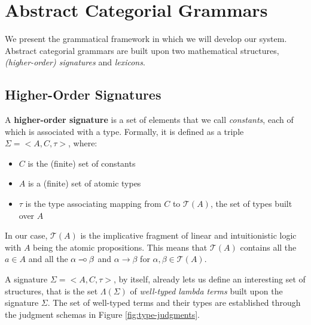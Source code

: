 \section{Abstract Categorial Grammars}
\label{sec:acg}

We present the grammatical framework in which we will develop our
system. Abstract categorial grammars are built upon two mathematical
structures, \emph{(higher-order) signatures} and \emph{lexicons}.

\subsection{Higher-Order Signatures}
\label{ssec:sig}

A \textbf{higher-order signature} is a set of elements that we call
\emph{constants}, each of which is associated with a type. Formally, it
is defined as a triple $\Sigma = \mathopen{<}A, C, \tau\mathclose{>}$,
where:
\begin{itemize}
  \item $C$ is the (finite) set of constants
  \item $A$ is a (finite) set of atomic types
  \item $\tau$ is the type associating mapping from $C$ to $\mathcal{T}(A)$,
    the set of types built over $A$
\end{itemize}

In our case, $\mathcal{T}(A)$ is the implicative fragment of linear and
intuitionistic logic with $A$ being the atomic propositions. This means
that $\mathcal{T}(A)$ contains all the $a \in A$ and all the $\alpha \mathbin{{-}\mkern-3.5mu{\circ}}
\beta$ and $\alpha \to \beta$ for $\alpha, \beta \in \mathcal{T}(A)$.

A signature $\Sigma = \mathopen{<}A, C, \tau\mathclose{>}$, by itself,
already lets us define an interesting set of structures, that is the set
$\Lambda(\Sigma)$ of \emph{well-typed lambda terms} built upon the
signature $\Sigma$. The set of well-typed terms and their types are
established through the judgment schemas in Figure
\ref{fig:type-judgments}.

